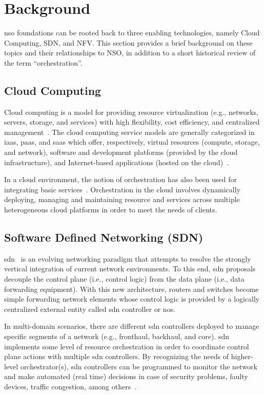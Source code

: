 \section{Background}
\label{sec:background}

\gls{nso} foundations can be rooted back to three enabling technologies, namely Cloud Computing, SDN, and NFV. This section provides a brief background on these topics and their relationships to NSO, in addition to a short historical review of the term ``orchestration''.

\subsection{Cloud Computing}
Cloud computing is a model for providing resource virtualization (e.g., networks, servers, storage, and services) with high flexibility, cost efficiency, and centralized management~\cite{Le2016SurveyNetworks}. The cloud computing service models are generally categorized in \gls{iaas}, \gls{paas}, and \gls{saas} which offer, respectively,  virtual resources (compute, storage, and network), software and development platforms (provided by the cloud infrastructure), and Internet-based applications (hosted on the cloud)~\cite{bele2018empirical}.

In a cloud environment, the notion of orchestration has also been used for integrating basic services~\cite{Vouk2008CloudImplementations}. Orchestration in the cloud involves dynamically deploying, managing and maintaining resource and services across multiple heterogeneous cloud platforms in order to meet the needs of clients. 

\subsection{Software Defined Networking (SDN)}
\gls{sdn}~\cite{surveySDN} is an evolving networking paradigm that attempts to resolve the strongly vertical integration of current network environments. To this end, \gls{sdn} proposals decouple the control plane (i.e., control logic) from the data plane (i.e., data forwarding equipment). With this new architecture, routers and switches become simple forwarding network elements whose control logic is provided by a logically centralized external entity called \gls{sdn} controller or \gls{nos}.

In multi-domain scenarios, there are different \gls{sdn} controllers deployed to manage specific segments of a network (e.g., fronthaul, backhaul, and core). \gls{sdn} implements some level of resource orchestration in order to coordinate control plane actions with multiple \gls{sdn} controllers. By recognizing the needs of higher-level  orchestrator(s), \gls{sdn} controllers can be programmed to monitor the network and make automated (real time) decisions in case of security problems, faulty devices, traffic congestion, among others~\cite{SDXCentral2015WhatSDNOrc}. 

